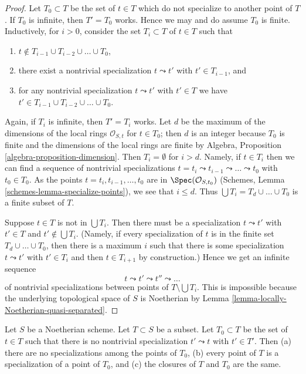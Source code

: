 \begin{proof}
Let $T_0 \subset T$ be the set of $t \in T$ which do not specialize
to another point of $T$. If $T_0$ is infinite, then $T' = T_0$ works.
Hence we may and do assume $T_0$ is finite.
Inductively, for $i > 0$, consider the set $T_i \subset T$
of $t \in T$ such that
\begin{enumerate}
\item $t \not \in T_{i - 1} \cup T_{i - 2} \cup \ldots \cup T_0$,
\item there exist a nontrivial specialization $t \leadsto t'$ with
$t' \in T_{i - 1}$, and
\item for any nontrivial specialization
$t \leadsto t'$ with $t' \in T$ we have
$t' \in T_{i - 1} \cup T_{i - 2} \cup \ldots \cup T_0$.
\end{enumerate}
Again, if $T_i$ is infinite, then $T' = T_i$ works.
Let $d$ be the maximum of the dimensions of the local rings
$\mathcal{O}_{S, t}$ for $t \in T_0$; then $d$ is an integer
because $T_0$ is finite and the dimensions of the local rings
are finite by Algebra, Proposition \ref{algebra-proposition-dimension}.
Then $T_i = \emptyset$ for $i > d$.
Namely, if $t \in T_i$ then we can find a sequence
of nontrivial specializations
$t = t_i \leadsto t_{i - 1} \leadsto \ldots \leadsto t_0$
with $t_0 \in T_0$. As
the points $t = t_i, t_{i - 1}, \ldots, t_0$ are in
$\Spec(\mathcal{O}_{S, t_0})$
(Schemes, Lemma \ref{schemes-lemma-specialize-points}),
we see that $i \leq d$.
Thus $\bigcup T_i = T_d \cup \ldots \cup T_0$ is a finite subset of $T$.

\medskip\noindent
Suppose $t \in T$ is not in $\bigcup T_i$. Then there must be a specialization
$t \leadsto t'$ with $t' \in T$ and $t' \not \in \bigcup T_i$. (Namely, if
every specialization of $t$ is in the finite set $T_d \cup \ldots \cup T_0$,
then there is a maximum $i$ such that there is some specialization
$t \leadsto t'$ with $t' \in T_i$ and then $t \in T_{i + 1}$ by construction.)
Hence we get an infinite sequence
$$
t \leadsto t' \leadsto t'' \leadsto \ldots
$$
of nontrivial specializations between points of $T \setminus \bigcup T_i$.
This is impossible because the underlying topological space of $S$
is Noetherian by Lemma \ref{lemma-locally-Noetherian-quasi-separated}.
\end{proof}

\begin{lemma}
\label{lemma-maximal-points}
Let $S$ be a Noetherian scheme. Let $T \subset S$ be a subset. Let
$T_0 \subset T$ be the set of $t \in T$ such that there is no nontrivial
specialization $t' \leadsto t$ with $t' \in T'$. Then (a) there are
no specializations among the points of $T_0$, (b) every point of
$T$ is a specialization of a point of $T_0$, and (c) the closures
of $T$ and $T_0$ are the same.
\end{lemma}

